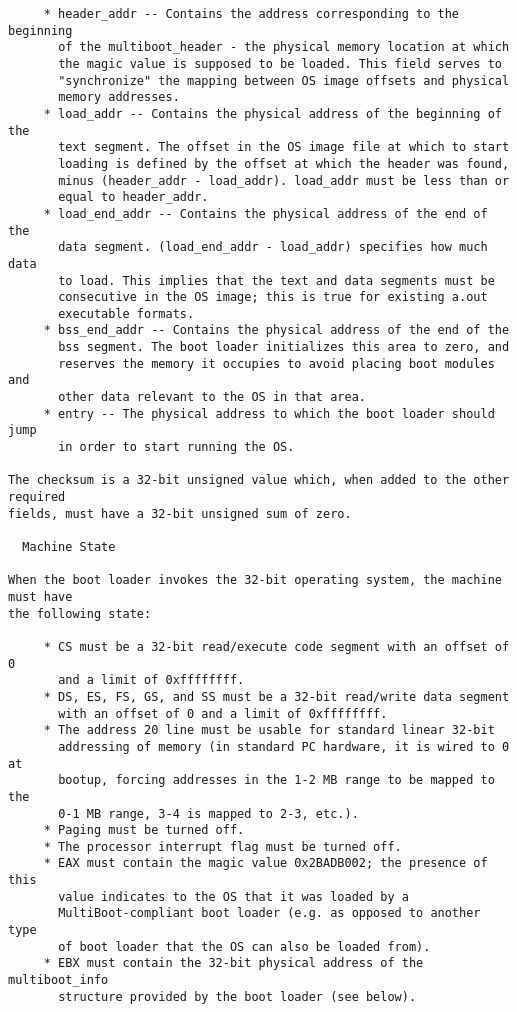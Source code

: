 \begin{verbatim}
     * header_addr -- Contains the address corresponding to the beginning
       of the multiboot_header - the physical memory location at which
       the magic value is supposed to be loaded. This field serves to
       "synchronize" the mapping between OS image offsets and physical
       memory addresses.
     * load_addr -- Contains the physical address of the beginning of the
       text segment. The offset in the OS image file at which to start
       loading is defined by the offset at which the header was found,
       minus (header_addr - load_addr). load_addr must be less than or
       equal to header_addr.
     * load_end_addr -- Contains the physical address of the end of the
       data segment. (load_end_addr - load_addr) specifies how much data
       to load. This implies that the text and data segments must be
       consecutive in the OS image; this is true for existing a.out
       executable formats.
     * bss_end_addr -- Contains the physical address of the end of the
       bss segment. The boot loader initializes this area to zero, and
       reserves the memory it occupies to avoid placing boot modules and
       other data relevant to the OS in that area.
     * entry -- The physical address to which the boot loader should jump
       in order to start running the OS.
       
The checksum is a 32-bit unsigned value which, when added to the other required
fields, must have a 32-bit unsigned sum of zero.

  Machine State
  
When the boot loader invokes the 32-bit operating system, the machine must have
the following state:

     * CS must be a 32-bit read/execute code segment with an offset of 0
       and a limit of 0xffffffff.
     * DS, ES, FS, GS, and SS must be a 32-bit read/write data segment
       with an offset of 0 and a limit of 0xffffffff.
     * The address 20 line must be usable for standard linear 32-bit
       addressing of memory (in standard PC hardware, it is wired to 0 at
       bootup, forcing addresses in the 1-2 MB range to be mapped to the
       0-1 MB range, 3-4 is mapped to 2-3, etc.).
     * Paging must be turned off.
     * The processor interrupt flag must be turned off.
     * EAX must contain the magic value 0x2BADB002; the presence of this
       value indicates to the OS that it was loaded by a
       MultiBoot-compliant boot loader (e.g. as opposed to another type
       of boot loader that the OS can also be loaded from).
     * EBX must contain the 32-bit physical address of the multiboot_info
       structure provided by the boot loader (see below).
       

\end{verbatim}
